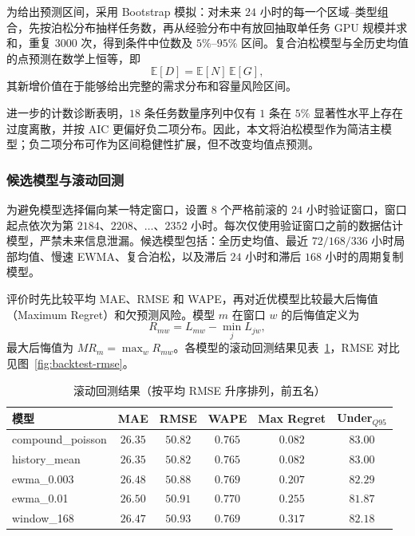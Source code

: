 \documentclass[UTF8,a4paper,zihao=-4]{ctexart}
\begin{document}
为给出预测区间，采用 Bootstrap 模拟：对未来 $24$ 小时的每一个区域--类型组合，先按泊松分布抽样任务数，再从经验分布中有放回抽取单任务 GPU 规模并求和，重复 $3000$ 次，得到条件中位数及 $5\%$--$95\%$ 区间。复合泊松模型与全历史均值的点预测在数学上恒等，即
\begin{equation}
\mathbb{E}[D]=\mathbb{E}[N]\,\mathbb{E}[G],
\end{equation}
其新增价值在于能够给出完整的需求分布和容量风险区间。

进一步的计数诊断表明，$18$ 条任务数量序列中仅有 $1$ 条在 $5\%$ 显著性水平上存在过度离散，并按 AIC 更偏好负二项分布。因此，本文将泊松模型作为简洁主模型；负二项分布可作为区间稳健性扩展，但不改变均值点预测。

\subsubsection{候选模型与滚动回测}

为避免模型选择偏向某一特定窗口，设置 $8$ 个严格前滚的 $24$ 小时验证窗口，窗口起点依次为第 $2184$、$2208$、$\dots$、$2352$ 小时。每次仅使用验证窗口之前的数据估计模型，严禁未来信息泄漏。候选模型包括：全历史均值、最近 $72/168/336$ 小时局部均值、慢速 EWMA、复合泊松，以及滞后 $24$ 小时和滞后 $168$ 小时的周期复制模型。

评价时先比较平均 MAE、RMSE 和 WAPE，再对近优模型比较最大后悔值（Maximum Regret）和欠预测风险。模型 $m$ 在窗口 $w$ 的后悔值定义为
\begin{equation}
R_{mw}=L_{mw}-\min_j L_{jw},
\end{equation}
最大后悔值为 $MR_m=\max_w R_{mw}$。各模型的滚动回测结果见表~\ref{tab:forecast-backtest}，RMSE 对比见图~\ref{fig:backtest-rmse}。

\begin{table}[htbp]
\centering
\small
\caption{滚动回测结果（按平均 RMSE 升序排列，前五名）}
\label{tab:forecast-backtest}
\begin{tabular}{lccccc}
\toprule
模型 & MAE & RMSE & WAPE & Max Regret & Under$_{Q95}$ \\
\midrule
compound\_poisson & $26.35$ & $50.82$ & $0.765$ & $0.082$ & $83.00$ \\
history\_mean     & $26.35$ & $50.82$ & $0.765$ & $0.082$ & $83.00$ \\
ewma\_0.003       & $26.48$ & $50.88$ & $0.769$ & $0.207$ & $82.29$ \\
ewma\_0.01        & $26.50$ & $50.91$ & $0.770$ & $0.255$ & $81.87$ \\
window\_168       & $26.47$ & $50.93$ & $0.769$ & $0.317$ & $82.18$ \\
\bottomrule
\end{tabular}
\end{table}
\end{document}
